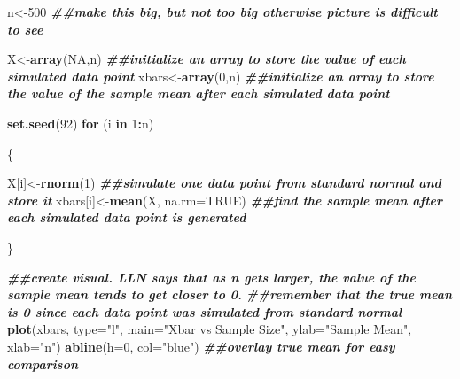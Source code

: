 \documentclass[
]{book}
\newenvironment{Shaded}{\begin{snugshade}}{\end{snugshade}}
\newcommand{\AttributeTok}[1]{\textcolor[rgb]{0.13,0.29,0.53}{#1}}
\newcommand{\ConstantTok}[1]{\textcolor[rgb]{0.56,0.35,0.01}{#1}}
\newcommand{\ControlFlowTok}[1]{\textcolor[rgb]{0.13,0.29,0.53}{\textbf{#1}}}
\newcommand{\DecValTok}[1]{\textcolor[rgb]{0.00,0.00,0.81}{#1}}
\newcommand{\DocumentationTok}[1]{\textcolor[rgb]{0.56,0.35,0.01}{\textbf{\textit{#1}}}}
\newcommand{\FunctionTok}[1]{\textcolor[rgb]{0.13,0.29,0.53}{\textbf{#1}}}
\newcommand{\NormalTok}[1]{#1}
\newcommand{\OtherTok}[1]{\textcolor[rgb]{0.56,0.35,0.01}{#1}}
\newcommand{\SpecialCharTok}[1]{\textcolor[rgb]{0.81,0.36,0.00}{\textbf{#1}}}
\newcommand{\StringTok}[1]{\textcolor[rgb]{0.31,0.60,0.02}{#1}}
\begin{document}
\begin{Shaded}
\begin{Highlighting}[]
\NormalTok{n}\OtherTok{\textless{}{-}}\DecValTok{500} \DocumentationTok{\#\#make this big, but not too big otherwise picture is difficult to see}

\NormalTok{X}\OtherTok{\textless{}{-}}\FunctionTok{array}\NormalTok{(}\ConstantTok{NA}\NormalTok{,n) }\DocumentationTok{\#\#initialize an array to store the value of each simulated data point}
\NormalTok{xbars}\OtherTok{\textless{}{-}}\FunctionTok{array}\NormalTok{(}\DecValTok{0}\NormalTok{,n) }\DocumentationTok{\#\#initialize an array to store the value of the sample mean after each simulated data point}

\FunctionTok{set.seed}\NormalTok{(}\DecValTok{92}\NormalTok{)}
\ControlFlowTok{for}\NormalTok{ (i }\ControlFlowTok{in} \DecValTok{1}\SpecialCharTok{:}\NormalTok{n)}

\NormalTok{\{}

\NormalTok{  X[i]}\OtherTok{\textless{}{-}}\FunctionTok{rnorm}\NormalTok{(}\DecValTok{1}\NormalTok{) }\DocumentationTok{\#\#simulate one data point from standard normal and store it}
\NormalTok{  xbars[i]}\OtherTok{\textless{}{-}}\FunctionTok{mean}\NormalTok{(X, }\AttributeTok{na.rm=}\ConstantTok{TRUE}\NormalTok{) }\DocumentationTok{\#\#find the sample mean after each simulated data point is generated}

\NormalTok{\}}

\DocumentationTok{\#\#create visual. LLN says that as n gets larger, the value of the sample mean tends to get closer to 0.}
\DocumentationTok{\#\#remember that the true mean is 0 since each data point was simulated from standard normal}
\FunctionTok{plot}\NormalTok{(xbars, }\AttributeTok{type=}\StringTok{"l"}\NormalTok{, }\AttributeTok{main=}\StringTok{"Xbar vs Sample Size"}\NormalTok{, }\AttributeTok{ylab=}\StringTok{"Sample Mean"}\NormalTok{, }\AttributeTok{xlab=}\StringTok{"n"}\NormalTok{)}
\FunctionTok{abline}\NormalTok{(}\AttributeTok{h=}\DecValTok{0}\NormalTok{, }\AttributeTok{col=}\StringTok{"blue"}\NormalTok{) }\DocumentationTok{\#\#overlay true mean for easy comparison}
\end{Highlighting}
\end{Shaded}
\end{document}
